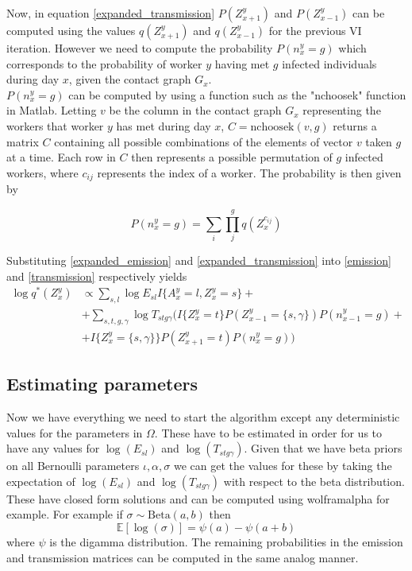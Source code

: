 Now, in equation \eqref{expanded_transmission} $P(Z_{x+1}^y)$ and $P(Z_{x-1}^y)$ can be computed using the values $q(Z_{x+1}^y)$ and $q(Z_{x-1}^y)$ for the previous VI iteration. However we need to compute the probability $P(n_x^y = g)$ which corresponds to the probability of worker $y$ having met $g$ infected individuals during day $x$, given the contact graph $G_x$. \\

$P(n_x^y = g)$ can be computed by using a function such as the "nchoosek" function in Matlab. Letting $v$ be the column in the contact graph $G_x$ representing the workers that worker $y$ has met during day $x$, $C = \text{nchoosek}(v, g)$ returns a matrix $C$ containing all possible combinations of the elements of vector $v$ taken $g$ at a time. Each row in $C$ then represents a possible permutation of $g$ infected workers, where $c_{ij}$ represents the index of a worker. The probability is then given by

\begin{equation}
  P(n_x^y = g) = \sum_i \prod_j^g q(Z_x^{c_{ij}})
  \label{contact_prob}
\end{equation}



Substituting \eqref{expanded_emission} and \eqref{expanded_transmission} into \eqref{emission} and \eqref{transmission} respectively yields
\begin{align}
  \log q^*(Z_x^y) & \propto \sum_{s,l} \log E_{sl} I\{A_x^y=l, Z_x^y=s\} + \nonumber\\
  & + \sum_{s,t,g,\gamma} \log T_{stg\gamma} \bigg( I\{Z_x^y = t\}P(Z_{x-1}^y = \{s,\gamma\})P(n_{x-1}^y = g) + \nonumber \\
  & + I\{Z_x^y = \{s,\gamma\}\}P(Z_{x+1}^y = t)P(n_x^y = g) \bigg)
  \label{final_eq}
\end{align}

\subsection*{Estimating parameters}
Now we have everything we need to start the algorithm except any deterministic values for the parameters in $\Omega$. These have to be estimated in order for us to have any values for $\log(E_{sl})$ and $\log(T_{stg\gamma})$. Given that we have beta priors on all Bernoulli parameters $\iota, \alpha, \sigma$ we can get the values for these by taking the expectation of $\log(E_{sl})$ and $\log(T_{stg\gamma})$ with respect to the beta distribution. These have closed form solutions and can be computed using wolframalpha for example. For example if $\sigma \sim \text{Beta}(a,b)$ then
$$\mathbb{E}[\log(\sigma)] = \psi(a) - \psi(a + b)$$
where $\psi$ is the digamma distribution. The remaining probabilities in the emission and transmission matrices can be computed in the same analog manner.



